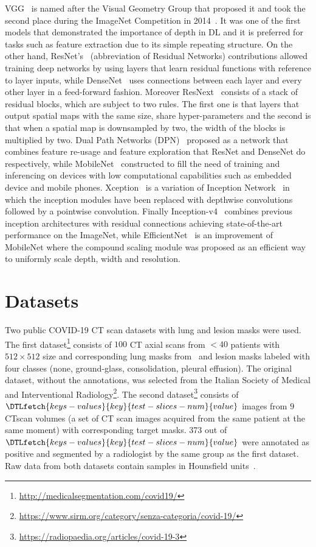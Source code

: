 \documentclass{elsarticle}
\begin{document}
VGG~\cite{simonyan2014very} is named after the Visual Geometry Group that proposed it and took the second place during the ImageNet Competition in 2014~\cite{deng2009imagenet}.
It was one of the first models that demonstrated the importance of depth in DL and it is preferred for tasks such as feature extraction due to its simple repeating structure.
On the other hand, ResNet's~\cite{he2016deep} (abbreviation of Residual Networks) contributions allowed training deep networks by using layers that learn residual functions with reference to layer inputs, while DenseNet~\cite{huang2017densely} uses connections between each layer and every other layer in a feed-forward fashion.
Moreover ResNext~\cite{xie2017aggregated} consists of a stack of residual blocks, which are subject to two rules.
The first one is that layers that output spatial maps with the same size, share hyper-parameters and the second is that when a spatial map is downsampled by two, the width of the blocks is multiplied by two.
Dual Path Networks (DPN)~\cite{chen2017dual} proposed as a network that combines feature re-usage and feature exploration that ResNet and DenseNet do respectively, while MobileNet~\cite{howard2017mobilenets} constructed to fill the need of training and inferencing on devices with low computational capabilities such as embedded device and mobile phones.
Xception~\cite{chollet2017xception} is a variation of Inception Network~\cite{szegedy2015going} in which the inception modules have been replaced with depthwise convolutions followed by a pointwise convolution.
Finally Inception-v4~\cite{szegedy2017inception} combines previous inception architectures with residual connections achieving state-of-the-art performance on the ImageNet, while EfficientNet~\cite{tan2019efficientnet} is an improvement of MobileNet where the compound scaling module was proposed as an efficient way to uniformly scale depth, width and resolution.

\section{Datasets}\label{sec:datasets}
Two public COVID-19 CT scan datasets with lung and lesion masks were used.
The first dataset\footnote{\url{http://medicalsegmentation.com/covid19/}} consists of $100$ CT axial scans from $<40$ patients with $512\times 512$ size and corresponding lung masks from~\cite{hofmanninger2020automatic} and lesion masks labeled with four classes (none, ground-glass, consolidation, pleural effusion).
The original dataset, without the annotations, was selected from the Italian Society of Medical and Interventional Radiology\footnote{\url{https://www.sirm.org/category/senza-categoria/covid-19/}}.
The second dataset\footnote{\url{https://radiopaedia.org/articles/covid-19-3}} consists of $\DTLfetch{keys-values}{key}{test-slices-num}{value}$ images from $9$ CT\@ scan volumes (a set of CT scan images acquired from the same patient at the same moment) with corresponding target masks.
373 out of $\DTLfetch{keys-values}{key}{test-slices-num}{value}$ were annotated as positive and segmented by a radiologist by the same group as the first dataset.
Raw data from both datasets contain samples in Hounsfield units~\cite{schneider1996calibration}.
\end{document}

